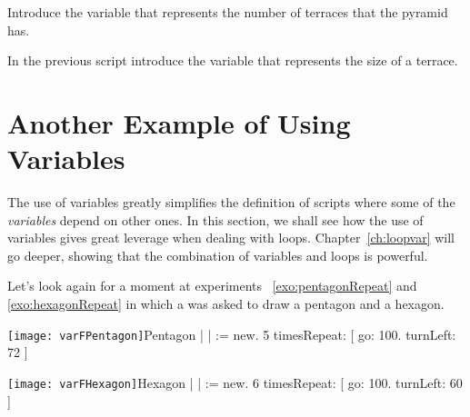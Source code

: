 \begin{exonofig}
Introduce the variable \newcommand{\replace}[2]{\ct{terracesNumber}}{} that represents the
 number of terraces that the pyramid \newcommand{\replace}[2]{can have}{has}. 
\end{exonofig}

\begin{exonofig}
In the previous script introduce the variable  that represents the size of a terrace.
\end{exonofig}
 
\section{Another Example of \newcommand{\replace}[2]{Variable Use}{Using Variables}}
The use of variables greatly simplifies the definition of scripts where some of the \emph{variables} depend on other ones. In this section, we shall see how the use of variables gives great leverage when dealing with loops. \newcommand{\remove}[1]{The} Chapter~\ref{ch:loopvar} will go deeper\newcommand{\replace}[2]{ in}{,} showing that the combination of variables and loops is powerful.

\newcommand{\replace}[2]{Let us}{Let's} look again for a moment at \newcommand{\replace}[2]{the experiements}{experiments} ~\ref{exo:pentagonRepeat} and
\ref{exo:hexagonRepeat}\newcommand{\add}[1]{,} in which a \Turtle was asked to draw a
pentagon and a hexagon. 

\begin{scriptfigwithsize}[.5]{\texttt{[image: varFPentagon]}}{Pentagon}
| \caro |
\caro := \Turtle new.
5 timesRepeat: 
               [ \caro go: 100.
               \caro turnLeft: 72 ]
\end{scriptfigwithsize}

\begin{scriptfigwithsize}[.5]{\texttt{[image: varFHexagon]}}{Hexagon}
| \caro |
\caro := \Turtle new.
6 timesRepeat: 
               [ \caro go: 100.
               \caro turnLeft: 60 ]
\end{scriptfigwithsize}

